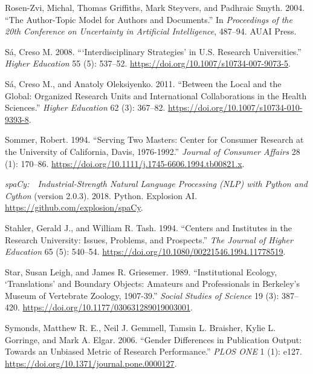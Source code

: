 \documentclass[
  11pt,
]{article}
\newlength{\cslhangindent}
\newenvironment{CSLReferences}[2] %
 {%
  \setlength{\parindent}{0pt}
  \ifodd #1 \everypar{\setlength{\hangindent}{\cslhangindent}}\ignorespaces\fi
  \ifnum #2 > 0
  \setlength{\parskip}{#2\baselineskip}
  \fi
 }%
 {}
\begin{document}
\begin{CSLReferences}{1}{0}
\leavevmode{}%
Rosen-Zvi, Michal, Thomas Griffiths, Mark Steyvers, and Padhraic Smyth. 2004. {``The Author-Topic Model for Authors and Documents.''} In \emph{Proceedings of the 20th Conference on Uncertainty in Artificial Intelligence}, 487--94. AUAI Press.

\leavevmode{}%
Sá, Creso M. 2008. {``{`Interdisciplinary Strategies'} in U.S. Research Universities.''} \emph{Higher Education} 55 (5): 537--52. \url{https://doi.org/10.1007/s10734-007-9073-5}.

\leavevmode{}%
Sá, Creso M., and Anatoly Oleksiyenko. 2011. {``Between the Local and the Global: Organized Research Units and International Collaborations in the Health Sciences.''} \emph{Higher Education} 62 (3): 367--82. \url{https://doi.org/10.1007/s10734-010-9393-8}.

\leavevmode{}%
Sommer, Robert. 1994. {``Serving Two Masters: Center for Consumer Research at the University of California, Davis, 1976-1992.''} \emph{Journal of Consumer Affairs} 28 (1): 170--86. \url{https://doi.org/10.1111/j.1745-6606.1994.tb00821.x}.

\leavevmode{}%
\emph{spaCy: 💫 Industrial-Strength Natural Language Processing (NLP) with Python and Cython} (version 2.0.3). 2018. Python. Explosion AI. \url{https://github.com/explosion/spaCy}.

\leavevmode{}%
Stahler, Gerald J., and William R. Tash. 1994. {``Centers and Institutes in the Research University: Issues, Problems, and Prospects.''} \emph{The Journal of Higher Education} 65 (5): 540--54. \url{https://doi.org/10.1080/00221546.1994.11778519}.

\leavevmode{}%
Star, Susan Leigh, and James R. Griesemer. 1989. {``Institutional Ecology, `Translations' and Boundary Objects: Amateurs and Professionals in Berkeley's Museum of Vertebrate Zoology, 1907-39.''} \emph{Social Studies of Science} 19 (3): 387--420. \url{https://doi.org/10.1177/030631289019003001}.

\leavevmode{}%
Symonds, Matthew R. E., Neil J. Gemmell, Tamsin L. Braisher, Kylie L. Gorringe, and Mark A. Elgar. 2006. {``Gender Differences in Publication Output: Towards an Unbiased Metric of Research Performance.''} \emph{PLOS ONE} 1 (1): e127. \url{https://doi.org/10.1371/journal.pone.0000127}.


\end{CSLReferences}
\end{document}
